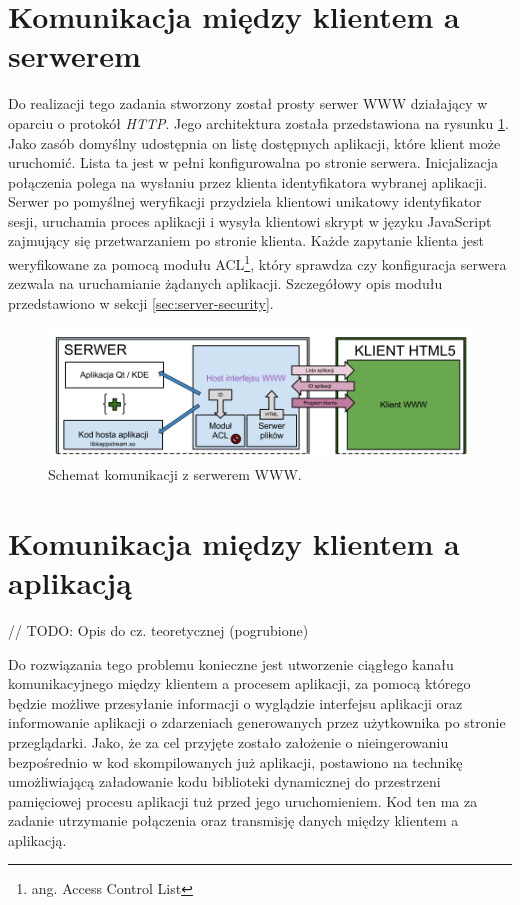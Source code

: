 \section{Komunikacja między klientem a serwerem}

Do realizacji tego zadania stworzony został prosty serwer WWW działający w oparciu o protokół \emph{HTTP}. Jego architektura została przedstawiona na rysunku \ref{fig:arch-www}. Jako zasób domyślny udostępnia on listę dostępnych aplikacji, które klient może uruchomić. Lista ta jest w pełni konfigurowalna po stronie serwera. Inicjalizacja połączenia polega na wysłaniu przez klienta identyfikatora wybranej aplikacji. Serwer po pomyślnej weryfikacji przydziela klientowi unikatowy identyfikator sesji, uruchamia proces aplikacji i wysyła klientowi skrypt w języku JavaScript zajmujący się przetwarzaniem po stronie klienta. Każde zapytanie klienta jest weryfikowane za pomocą modułu ACL\footnote{ang. Access Control List}, który sprawdza czy konfiguracja serwera zezwala na uruchamianie żądanych aplikacji. Szczegółowy opis modułu przedstawiono w sekcji \ref{sec:server-security}.

\begin{figure}[H]
\centering
\includegraphics[width=1.0\linewidth]{img/arch-www}
\caption{Schemat komunikacji z serwerem WWW.}
\label{fig:arch-www}
\end{figure}

\section{Komunikacja między klientem a aplikacją}

// TODO: Opis do cz. teoretycznej (pogrubione)

Do rozwiązania tego problemu konieczne jest utworzenie ciągłego kanału komunikacyjnego między klientem a procesem aplikacji, za pomocą którego będzie możliwe przesyłanie informacji o wyglądzie interfejsu aplikacji oraz informowanie aplikacji o zdarzeniach generowanych przez użytkownika po stronie przeglądarki. Jako, że za cel przyjęte zostało założenie o nieingerowaniu bezpośrednio w kod skompilowanych już aplikacji, postawiono na technikę umożliwiającą załadowanie kodu biblioteki dynamicznej do przestrzeni pamięciowej procesu aplikacji tuż przed jego uruchomieniem. Kod ten ma za zadanie utrzymanie połączenia oraz transmisję danych między klientem a aplikacją.

